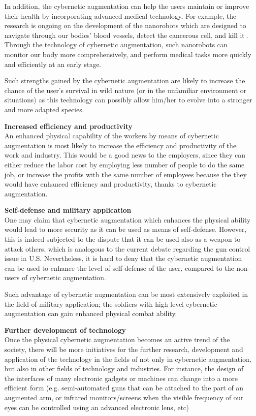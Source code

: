 In addition, the cybernetic augmentation can help the users maintain or improve their health by incorporating advanced medical technology. For example, the research is ongoing on the development of the nanorobots which are designed to navigate through our bodies' blood vessels, detect the cancerous cell, and kill it \cite{nanorobot}. Through the technology of cybernetic augmentation, such nanorobots can monitor our body more comprehensively, and perform medical tasks more quickly and efficiently at an early stage. 

Such strengths gained by the cybernetic augmentation are likely to increase the chance of the user's survival in wild nature (or in the unfamiliar environment or situations) as this technology can possibly allow him/her to evolve into a stronger and more adapted species. 

{\bf Increased efficiency and productivity}\\
An enhanced physical capability of the workers by means of cybernetic augmentation is most likely to increase the efficiency and productivity of the work and industry. This would be a good news to the employers, since they can either reduce the labor cost by employing less number of people to do the same job, or increase the profits with the same number of employees because the they would have enhanced efficiency and productivity, thanks to cybernetic augmentation.

{\bf Self-defense and military application}\\
One may claim that cybernetic augmentation which enhances the physical ability would lead to more security as it can be used as means of self-defense. However, this is indeed subjected to the dispute that it can be used also as a weapon to attack others, which is analogous to the current debate regarding the gun control issue in U.S. Nevertheless, it is hard to deny that the cybernetic augmentation can be used to enhance the level of self-defense of the user, compared to the non-users of cybernetic augmentation.

Such advantage of cybernetic augmentation can be most extensively exploited in the field of military application; the soldiers with high-level cybernetic augmentation can gain enhanced physical combat ability.

{\bf Further development of technology}\\
Once the physical cybernetic augmentation becomes an active trend of the society, there will be more initiatives for the further research, development and application of the technology in the fields of not only in cybernetic augmentation, but also in other fields of technology and industries. For instance, the design of the interfaces of many electronic gadgets or machines can change into a more efficient form (e.g. semi-automated guns that can be attached to the part of an augmented arm, or infrared monitors/screens when the visible frequency of our eyes can be controlled using an advanced electronic lens, etc)


